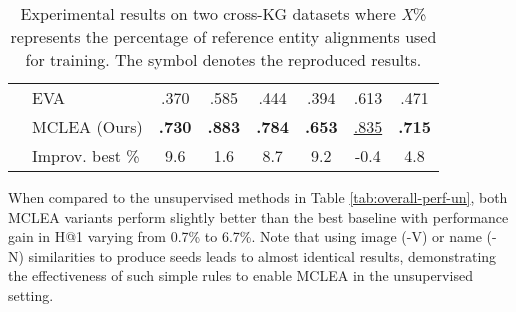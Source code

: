 \documentclass[11pt]{article}
\begin{document}
\begin{table}[ht]
\begin{tabular}{@{}l|l|ccc|ccc@{}}
        & EVA & .370 & .585 & .444 & .394 & .613 & .471 \\
        & MCLEA {\tiny(Ours)} & \textbf{.730} & \textbf{.883} & \textbf{.784} & \textbf{.653} & \underline{.835} & \textbf{.715} \\
\cmidrule(lr){2-8}
        & Improv. best \% & 
        9.6 & 1.6 & 8.7 & 9.2 & -0.4 & 4.8 \\
        \bottomrule
    \end{tabular}
    \caption{Experimental results on two cross-KG datasets where \textit{X}\% represents the percentage of reference entity alignments used for training. The symbol  denotes the reproduced results.
    }
    \label{tab:overall-perf-2}
\end{table}

When compared to the unsupervised methods in Table \ref{tab:overall-perf-un}, both MCLEA variants perform slightly better than the best baseline with performance gain in H@1 varying from 0.7\% to 6.7\%.
Note that using image (-V) or name (-N) similarities to produce seeds leads to almost identical results, demonstrating the effectiveness of such simple rules to enable MCLEA in the unsupervised setting.
\end{document}
